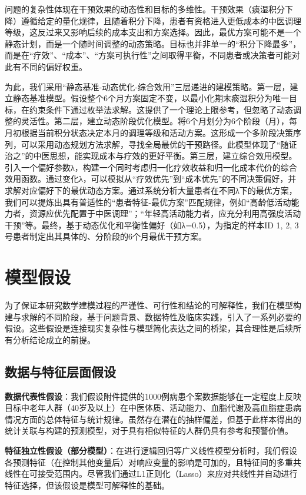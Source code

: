 \documentclass[12pt,a4paper]{ctexart}
\begin{document}
问题的复杂性体现在干预效果的动态性和目标的多维性。干预效果（痰湿积分下降）遵循给定的量化规律，且随着积分下降，患者有资格进入更低成本的中医调理等级，这反过来又影响后续的成本支出和方案选择。因此，最优方案可能不是一个静态计划，而是一个随时间调整的动态策略。目标也并非单一的“积分下降最多”，而是在“疗效”、“成本”、“方案可执行性”之间取得平衡，不同患者或决策者可能对此有不同的偏好权重。

为此，我们采用“静态基准-动态优化-综合效用”三层递进的建模策略。第一层，建立静态基准模型。假设整个6个月方案固定不变，以最小化期末痰湿积分为唯一目标，在约束条件下通过枚举法求解。这提供了一个理论上限参考，但忽略了动态调整的灵活性。第二层，建立动态阶段优化模型。将6个月划分为6个阶段（月），每月初根据当前积分状态决定本月的调理等级和活动方案。这形成一个多阶段决策序列，可以采用动态规划方法求解，寻找全局最优的干预路径。此模型体现了“随证治之”的中医思想，能实现成本与疗效的更好平衡。第三层，建立综合效用模型。引入一个偏好参数λ，构建一个同时考虑归一化疗效收益和归一化成本代价的综合效用函数。通过变化λ，可以模拟从“疗效优先”到“成本优先”的不同决策偏好，并求解对应偏好下的最优动态方案。通过系统分析大量患者在不同λ下的最优方案，我们可以提炼出具有普适性的“患者特征-最优方案”匹配规律，例如“高龄低活动能力者，资源应优先配置于中医调理”；“年轻高活动能力者，应充分利用高强度活动干预”等。最终，基于动态优化和平衡性偏好（如λ=0.5），为指定的样本ID 1, 2, 3号患者制定出其具体的、分阶段的6个月最优干预方案。
\section{模型假设}

为了保证本研究数学建模过程的严谨性、可行性和结论的可解释性，我们在模型构建与求解的不同阶段，基于问题背景、数据特性及临床实践，引入了一系列必要的假设。这些假设是连接现实复杂性与模型简化表达之间的桥梁，其合理性是后续所有分析结论成立的前提。

\subsection{数据与特征层面假设}
\textbf{数据代表性假设}：我们假设附件提供的1000例病患个案数据能够在一定程度上反映目标中老年人群（40岁及以上）在中医体质、活动能力、血脂代谢及高血脂症患病情况方面的总体特征与统计规律。虽然存在潜在的抽样偏差，但基于此样本得出的统计关联与构建的预测模型，对于具有相似特征的人群仍具有参考和预警价值。

\textbf{特征独立性假设（部分模型）}：在进行逻辑回归等广义线性模型分析时，我们假设各预测特征（在控制其他变量后）对响应变量的影响是可加的，且特征间的多重共线性在可接受范围内。尽管我们通过L1正则化（Lasso）来应对共线性并自动进行特征选择，但该假设是模型可解释性的基础。
\end{document}
